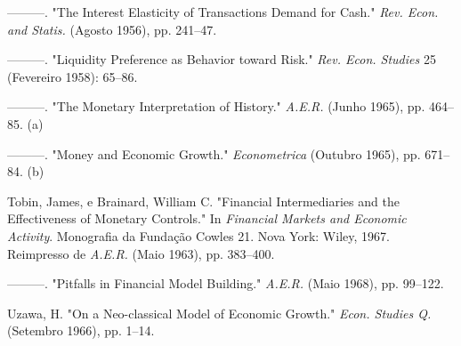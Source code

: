 \documentclass[12pt]{article}
\begin{document}
———. "The Interest Elasticity of Transactions Demand for Cash." \textit{Rev. Econ. and Statis.} (Agosto 1956), pp. 241–47.

———. "Liquidity Preference as Behavior toward Risk." \textit{Rev. Econ. Studies} 25 (Fevereiro 1958): 65–86.

———. "The Monetary Interpretation of History." \textit{A.E.R.} (Junho 1965), pp. 464–85. (a)

———. "Money and Economic Growth." \textit{Econometrica} (Outubro 1965), pp. 671–84. (b)

Tobin, James, e Brainard, William C. "Financial Intermediaries and the Effectiveness of Monetary Controls." In \textit{Financial Markets and Economic Activity}. Monografia da Fundação Cowles 21. Nova York: Wiley, 1967. Reimpresso de \textit{A.E.R.} (Maio 1963), pp. 383–400.

———. "Pitfalls in Financial Model Building." \textit{A.E.R.} (Maio 1968), pp. 99–122.

Uzawa, H. "On a Neo-classical Model of Economic Growth." \textit{Econ. Studies Q.} (Setembro 1966), pp. 1–14.
\end{document}
